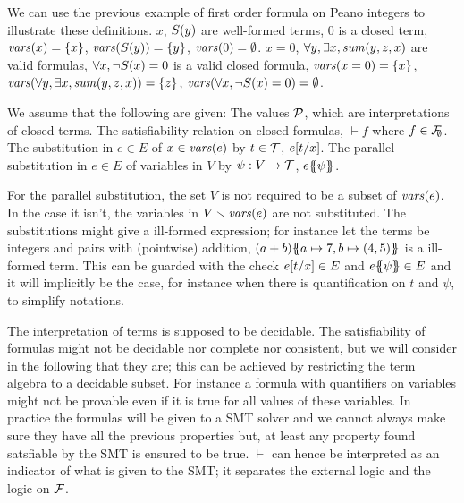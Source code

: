 \documentclass{article}
\begin{document}
We can use the previous example of first order formula on Peano integers to illustrate these definitions.
\(x\), \(S{\left(y\right)}\) are well-formed terms, \(0\) is a closed term, \(\mathit{vars}{\left(x\right)} = {\left\{x\right\}}\), \(\mathit{vars}{\left(S{\left(y\right)}\right)} = {\left\{y\right\}}\), \(\mathit{vars}{\left(0\right)} = \emptyset\).
\(x = 0\), \(\forall y, \exists x, \mathit{sum}{\left(y, z, x\right)}\) are valid formulas, \(\forall x, \neg S{\left(x\right)} = 0\) is a valid closed formula, \(\mathit{vars}{\left(x = 0\right)} = {\left\{x\right\}}\), \(\mathit{vars}{\left(\forall y, \exists x, \mathit{sum}{\left(y, z, x\right)}\right)} = {\left\{z\right\}}\), \(\mathit{vars}{\left(\forall x, \neg S{\left(x\right)} = 0\right)} = \emptyset\).

\begin{defi}
We assume that the following are given:
 The values \(\mathcal{P}\), which are interpretations of closed terms.
 The satisfiability relation on closed formulas, \({\vdash} f\) where \(f \in {\mathcal{F}}_{\!\!\emptyset}\).
 The substitution in \(e \in E\) of \(x \in \mathit{vars}{\left(e\right)}\) by \(t \in {\mathcal{T}}\), \(e{\left[t\middle/x\right]}\).
 The parallel substitution in \(e \in E\) of variables in \(V\) by \(\psi: V \to {\mathcal{T}}\), \(e{\left\{\!\!{\left\{\psi\right\}}\!\!\right\}}\).
\end{defi}
For the parallel substitution, the set \(V\) is not required to be a subset of \(\mathit{vars}{\left(e\right)}\).
In the case it isn't, the variables in \(V \smallsetminus \mathit{vars}{\left(e\right)}\) are not substituted.
The substitutions might give a ill-formed expression; for instance let the terms be integers and pairs with (pointwise) addition, \({\left(a + b\right)}{\left\{\!\!{\left\{a \mapsto 7, b \mapsto {\left(4, 5\right)}\right\}}\!\!\right\}}\) is a ill-formed term.
This can be guarded with the check \(e{\left[t\middle/x\right]} \in E\) and \(e{\left\{\!\!{\left\{\psi\right\}}\!\!\right\}} \in E\) and it will implicitly be the case, for instance when there is quantification on \(t\) and \(\psi\), to simplify notations.

The interpretation of terms is supposed to be decidable.
The satisfiability of formulas might not be decidable nor complete nor consistent,
but we will consider in the following that they are; this can be achieved by restricting the term algebra to a decidable subset.
For instance a formula with quantifiers on variables might not be provable even if it is true for all values of these variables.
In practice the formulas will be given to a SMT solver and we cannot always make sure they have all the previous properties but, at least any property found satsfiable by the SMT is ensured to be true.
\(\vdash\) can hence be interpreted as an indicator of what is given to the SMT; it separates the external logic and the logic on \({\mathcal{F}}\).
\end{document}
